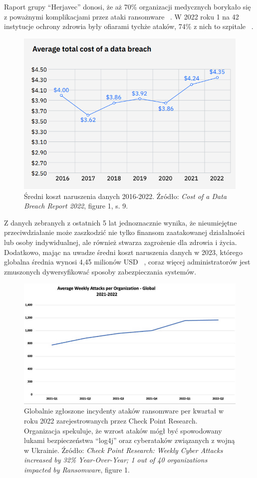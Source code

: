  Raport grupy \foreignquote{english}{Herjavec} donosi, że aż 70\% organizacji medycznych borykało się z poważnymi komplikacjami przez ataki ransomware ~\cite{health}.
 W 2022 roku 1 na 42 instytucje ochrony zdrowia były ofiarami tychże ataków, 74\% z nich to szpitale 
 ~\cite{etal_check_2022}.
 \begin{figure}[H]
    \centering
    \includegraphics[width=0.7\linewidth]{rysunki/costOfDataBreach.png}
    \caption{Średni koszt naruszenia danych 2016-2022. Źródło: \emph{Cost of a Data Breach
Report 2022}, figure 1, s. 9.}
    \label{fig:enter-label}
\end{figure}
 Z danych zebranych z ostatnich 5 lat jednoznacznie wynika, że nieumiejętne przeciwdziałanie może zaszkodzić nie tylko finansom zaatakowanej działalności lub osoby indywidualnej, ale również stwarza zagrożenie dla zdrowia i życia.
 Dodatkowo, mając na uwadze średni koszt naruszenia danych w 2023, którego globalna średnia wynosi 4,45 milionów USD ~\cite{petrosyan_global_cost},
 coraz więcej administratorów jest zmuszonych dywersyfikować sposoby zabezpieczania systemów. 
 \begin{figure}[H]
     \centering
     \includegraphics[width=0.75\linewidth]{rysunki/Global-Quarterly-attacks-from-Q1-2021- Q2-2022.png}
     \caption{Globalnie zgłoszone incydenty ataków ransomware per kwartał w roku 2022 zarejestrowanych przez Check Point Research. Organizacja spekuluje, że wzrost ataków mógł być spowodowany lukami bezpieczeństwa \foreignquote{english}{log4j} oraz cyberataków związanych z wojną w Ukrainie. Źródło: \emph{Check Point Research: Weekly Cyber Attacks increased by 32\% Year-Over-Year; 1 out of 40 organizations impacted by Ransomware}, figure 1.}
     \label{fig:enter-label}
 \end{figure}
